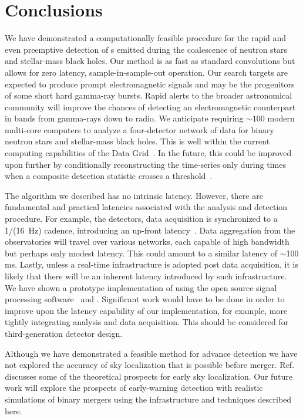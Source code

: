 \section{Conclusions}
\label{SECV}\label{sec:conclusions}

We have demonstrated a computationally feasible procedure for the rapid and
even preemptive detection of \GW{}s emitted during the coalescence
of neutron stars and stellar-mass black holes. Our method is as fast as
standard \fft{} convolutions but allows for zero latency, sample-in-sample-out
operation.  Our search targets are expected to produce prompt electromagnetic
signals and may be the progenitors of some short hard gamma-ray bursts.  Rapid
alerts to the broader astronomical community will improve the chances of
detecting an electromagnetic counterpart in bands from gamma-rays down to
radio.  We anticipate requiring $\sim100$ modern multi-core computers to
analyze a four-detector network of \GW{} data for binary neutron
stars and stellar-mass black holes.  This is well within the current computing
capabilities of the \LIGO{} Data Grid~\cite{LDG}. In the future, this could be
improved upon further by conditionally reconstructing the \SNR{} time-series
only during times when a composite detection statistic crosses a
threshold~\cite{svd-compdetstat}.

The algorithm we described has no intrinsic latency.  However, there are
fundamental and practical latencies associated with the analysis and detection
procedure. For example, the \LIGO{} detectors, data acquisition is synchronized
to a 1/(16~Hz) cadence, introducing an up-front latency~\cite{Bork2001}. Data
aggregation from the observatories will travel over various networks, each
capable of high bandwidth but perhaps only modest latency.  This could amount to
a similar latency of $\sim$100 ms.  Lastly, unless a real-time infrastructure
is adopted post data acquisition, it is likely that there will be an inherent
latency introduced by such infrastructure.  We have shown a prototype
implementation of \lloid{} using the open source signal processing software
\gstreamer\ and \gstlal. Significant work would have to be done in order to
improve upon the latency capability of our implementation, for example, more
tightly integrating analysis and data acquisition. This should be considered
for third-generation detector design.

Although we have demonstrated a feasible method for advance detection we have
not explored the accuracy of sky localization that is possible before merger.
Ref.~\cite{Fairhurst2009} discusses some of the theoretical prospects for early
sky localization.  Our future work will explore the prospects of early-warning
detection with realistic simulations of binary mergers using the infrastructure
and techniques described here. 

